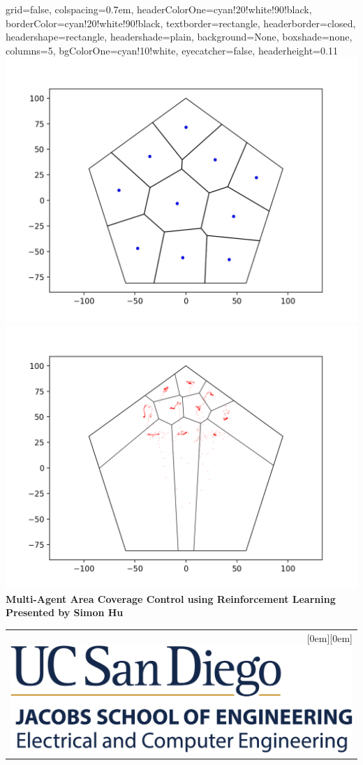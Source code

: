 \documentclass[portrait,fontscale=0.292,paperheight=48in,paperwidth=36in]{baposter}
\begin{document}
\vspace{-7em}
\begin{poster}
	{	
		grid=false, 
		colspacing=0.7em,
		headerColorOne=cyan!20!white!90!black,
		borderColor=cyan!20!white!90!black,	
		textborder=rectangle,
		headerborder=closed,
		headershape=rectangle,
		headershade=plain,
		background=None,
		boxshade=none,
		columns=5,
		bgColorOne=cyan!10!white,
		eyecatcher=false,
		headerheight=0.11\textheight
	}
	{
		\includegraphics[scale=0.2]{voronoi_partition}
		\includegraphics[scale=0.2]{gaussian_simulation_1}
	}
	{\sc\huge\bf Multi-Agent Area Coverage Control using Reinforcement Learning}	
	{\Large\bf Presented by Simon Hu}
	{
		\begin{tabular}{r}
			\raisebox{0em}[0em][0em]{\includegraphics[height=0.03\textheight]{logo}}
		\end{tabular}
	}


\end{poster}
\end{document}
